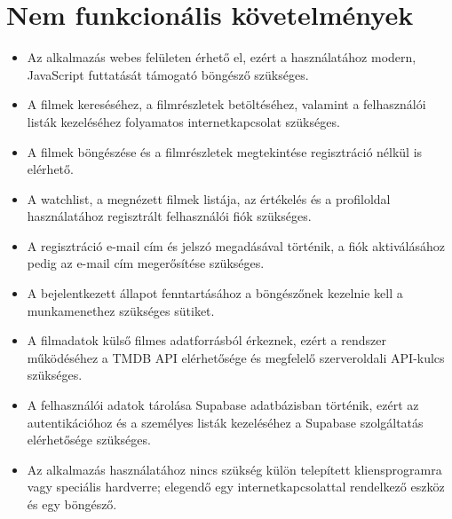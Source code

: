 \section{Nem funkcionális követelmények}

\begin{itemize}
    \item Az alkalmazás webes felületen érhető el, ezért a használatához modern, JavaScript futtatását támogató böngésző szükséges.
    \item A filmek kereséséhez, a filmrészletek betöltéséhez, valamint a felhasználói listák kezeléséhez folyamatos internetkapcsolat szükséges.
    \item A filmek böngészése és a filmrészletek megtekintése regisztráció nélkül is elérhető.
    \item A watchlist, a megnézett filmek listája, az értékelés és a profiloldal használatához regisztrált felhasználói fiók szükséges.
    \item A regisztráció e-mail cím és jelszó megadásával történik, a fiók aktiválásához pedig az e-mail cím megerősítése szükséges.
    \item A bejelentkezett állapot fenntartásához a böngészőnek kezelnie kell a munkamenethez szükséges sütiket.
    \item A filmadatok külső filmes adatforrásból érkeznek, ezért a rendszer működéséhez a TMDB API elérhetősége és megfelelő szerveroldali API-kulcs szükséges.
    \item A felhasználói adatok tárolása Supabase adatbázisban történik, ezért az autentikációhoz és a személyes listák kezeléséhez a Supabase szolgáltatás elérhetősége szükséges.
    \item Az alkalmazás használatához nincs szükség külön telepített kliensprogramra vagy speciális hardverre; elegendő egy internetkapcsolattal rendelkező eszköz és egy böngésző.
\end{itemize}
